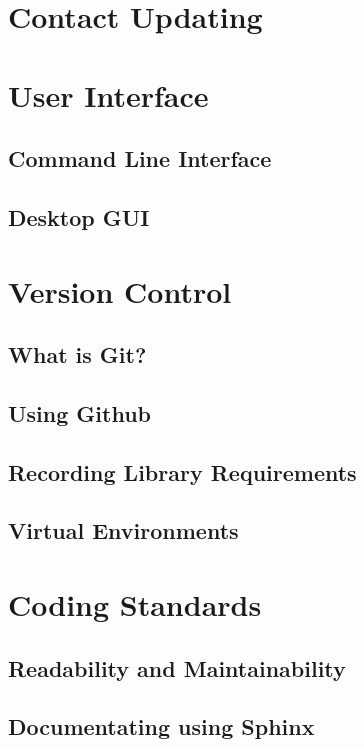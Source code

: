 \documentclass[11pt]{article}
\begin{document}
\newpage

\section{Contact Updating}



\newpage

\section{User Interface}

\subsection{Command Line Interface}






\subsection{Desktop GUI}




\newpage

\section{Version Control}

\subsection{What is Git?}



\subsection{Using Github}



\subsection{Recording Library Requirements}



\subsection{Virtual Environments}



\newpage

\section{Coding Standards}

\subsection{Readability and Maintainability}



\subsection{Documentating using Sphinx}



%
\end{document}
